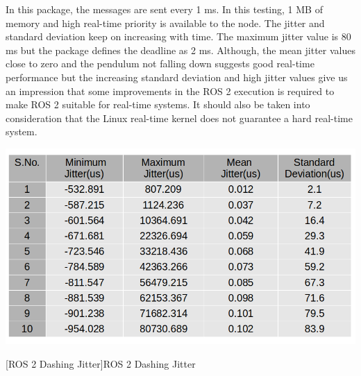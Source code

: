 \documentclass[%
xelatex,
	oneside,		%
	12pt,			%
	parskip=half,	%
	abstracton,
	chapterprefix=true%
    appendixprefix=true]
{scrbook}
\begin{document}
In this package, the messages are sent every 1 ms. In this testing, 1 MB of memory and high real-time priority is available to the node. The jitter and standard deviation keep on increasing with time. The maximum jitter value is 80 ms but the package defines the deadline as 2 ms. Although, the mean jitter values close to zero and the pendulum not falling down suggests good real-time performance but the increasing standard deviation and high jitter values give us an impression that some improvements in the ROS 2 execution is required to make ROS 2 suitable for real-time systems. It should also be taken into consideration that the Linux real-time kernel does not guarantee a hard real-time system.
\begin{center}
\includegraphics[scale=0.4]{fig/ros2dashjitter.png}

[ROS 2 Dashing Jitter]{ROS 2 Dashing Jitter}
\label{tab:ros2dashjit}
\end{center}
\end{document}
